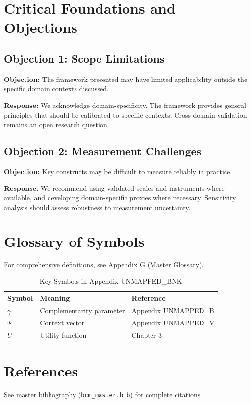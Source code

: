 \documentclass[11pt]{article}
\begin{document}

\section{Critical Foundations and Objections}
\label{sec:bnk-foundations}

\subsection{Objection 1: Scope Limitations}

\textbf{Objection:} The framework presented may have limited applicability
outside the specific domain contexts discussed.

\textbf{Response:} We acknowledge domain-specificity. The framework provides
general principles that should be calibrated to specific contexts. Cross-domain
validation remains an open research question.

\subsection{Objection 2: Measurement Challenges}

\textbf{Objection:} Key constructs may be difficult to measure reliably in
practice.

\textbf{Response:} We recommend using validated scales and instruments where
available, and developing domain-specific proxies where necessary. Sensitivity
analysis should assess robustness to measurement uncertainty.



\section{Glossary of Symbols}
\label{sec:bnk-glossary}

For comprehensive definitions, see Appendix G (Master Glossary).

\begin{table}[htbp]
\centering
\caption{Key Symbols in Appendix UNMAPPED_BNK}
\begin{tabular}{lll}
\toprule
\textbf{Symbol} & \textbf{Meaning} & \textbf{Reference} \\
\midrule
$\gamma$ & Complementarity parameter & Appendix UNMAPPED_B \\
$\Psi$ & Context vector & Appendix UNMAPPED_V \\
$U$ & Utility function & Chapter 3 \\
\bottomrule
\end{tabular}
\end{table}


\section{References}
\label{sec:references}

See master bibliography (\texttt{bcm\_master.bib}) for complete citations.

\nocite{bcm_master}
\end{document}
